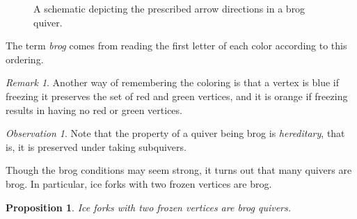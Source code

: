 \documentclass[12pt]{amsart}
\newtheorem{prop}[thm]{Proposition}
\theoremstyle{definition}
\theoremstyle{remark}
\newtheorem{rem}[thm]{Remark}
\newtheorem{obs}[thm]{Observation}
\numberwithin{equation}{section}
\begin{document}
\begin{figure}[h]
\centering
\caption{A schematic depicting the prescribed arrow directions in a brog quiver.}
\label{fig: brog order}
\end{figure}
  The term \emph{brog} comes from reading the first letter of each color according to this ordering.

\begin{rem}
    Another way of remembering the coloring is that a vertex is blue if freezing it preserves the set of red and green vertices, and it is orange if freezing results in having no red or green vertices.
\end{rem}

\begin{obs}
Note that the property of a quiver being brog is \emph{hereditary}, that is, it is preserved under taking subquivers.
\end{obs}


Though the brog conditions may seem strong, it turns out that many quivers are brog. In particular, ice forks with two frozen vertices are brog. 


\begin{prop}
\label{prop: ice forks brog}
Ice forks with two frozen vertices are brog quivers.
\end{prop}
\end{document}
